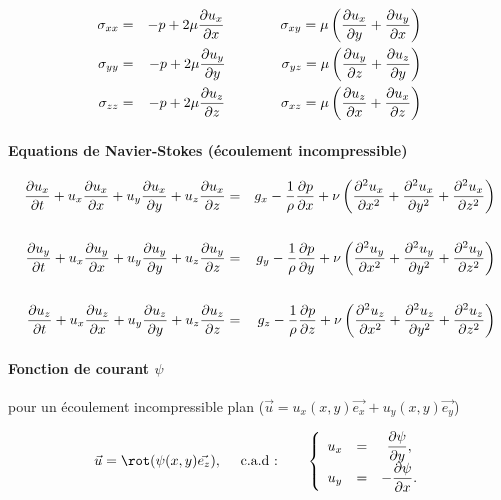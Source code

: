 \begin{eqnarray*}
\sigma_{xx} & = & -p + 2\mu \dpa{u_x}{x} \qquad \qquad 
\sigma_{xy} = \mu \left ( \dpa{u_x}{y} + \dpa{u_y}{x} \right ) \\
\sigma_{yy} & = & -p + 2\mu \dpa{u_y}{y} \qquad \qquad 
\sigma_{yz} = \mu \left ( \dpa{u_y}{z} + \dpa{u_z}{y} \right ) \\
\sigma_{zz} & = & -p + 2\mu \dpa{u_z}{z} \qquad \qquad 
\sigma_{xz} = \mu \left ( \dpa{u_z}{x} + \dpa{u_x}{z} \right ) 
\end{eqnarray*}



\paragraph{Equations de Navier-Stokes (écoulement incompressible)}

\begin{eqnarray*}
\dpa{u_x}{t} + u_x \dpa{u_x}{x} + u_y \dpa{u_x}{y} + u_z \dpa{u_x}{z} & = &
{ g_x} - \frac{1}{\rho} \dpa{p}{x}
+ \nu \left ( \ddpa{u_x}{x} + \ddpa{u_x}{y} + \ddpa{u_x}{z} \right )
\\ & & \\
\dpa{u_y}{t} + u_x \dpa{u_y}{x} + u_y \dpa{u_y}{y} + u_z \dpa{u_y}{z} & = &
{ g_y} - \frac{1}{\rho} \dpa{p}{y}
+ \nu \left ( \ddpa{u_y}{x} + \ddpa{u_y}{y} + \ddpa{u_y}{z} \right )
\\ & & \\
\dpa{u_z}{t} + u_x \dpa{u_z}{x} + u_y \dpa{u_z}{y} + u_z \dpa{u_z}{z} & = &
{ g_z} - \frac{1}{\rho} \dpa{p}{z}
+ \nu \left ( \ddpa{u_z}{x} + \ddpa{u_z}{y} + \ddpa{u_z}{z} \right )
\end{eqnarray*}


\paragraph{Fonction de courant $\psi$ } pour un écoulement incompressible plan 
($\vec{u} = u_x(x,y) \vec{e_x} + u_y(x,y) \vec{e_y}$)


\begin{equation}
 \vec{u} = \rot (\psi(x,y) \vec{e_z}), 
\quad \mbox{ c.a.d :} \quad \quad 
\left\{
\begin{array}{ccc}
 u_x &=& \displaystyle \dpa{\psi}{y}, \\
 u_y &=& \displaystyle -\dpa{\psi}{x}.
\end{array}
\right.
\end{equation}







